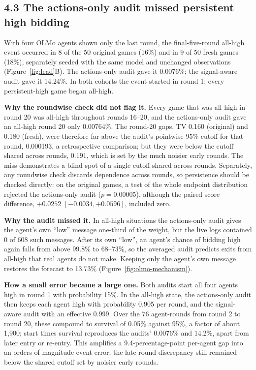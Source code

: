 \documentclass[11pt,letterpaper]{article}
\begin{document}
\subsection{4.3 The actions-only audit missed persistent high bidding}

With four OLMo agents shown only the last round, the final-five-round all-high event occurred in 8 of the 50 original games (16\%) and in 9 of 50 fresh games (18\%), separately seeded with the same model and unchanged observations (Figure~\ref{fig:lead}B).
The actions-only audit gave it 0.0076\%; the signal-aware audit gave it 14.24\%.
In both cohorts the event started in round 1: every persistent-high game began all-high.

\textbf{Why the roundwise check did not flag it.}
Every game that was all-high in round 20 was all-high throughout rounds 16--20, and the actions-only audit gave an all-high round 20 only 0.00764\%.
The round-20 gaps, TV 0.160 (original) and 0.180 (fresh), were therefore far above the audit's pointwise 95\% cutoff for that round, 0.000193, a retrospective comparison; but they were below the cutoff shared across rounds, 0.191, which is set by the much noisier early rounds.
The miss demonstrates a blind spot of a single cutoff shared across rounds.
Separately, any roundwise check discards dependence across rounds, so persistence should be checked directly: on the original games, a test of the whole endpoint distribution rejected the actions-only audit ($p = 0.00005$), although the paired score difference, $+0.0252$ $[-0.0034, +0.0596]$, included zero.

\textbf{Why the audit missed it.}
In all-high situations the actions-only audit gives the agent's own ``low'' message one-third of the weight, but the live logs contained 0 of 608 such messages.
After its own ``low'', an agent's chance of bidding high again falls from above 99.8\% to 68--73\%, so the averaged audit predicts exits from all-high that real agents do not make.
Keeping only the agent's own message restores the forecast to 13.73\% (Figure~\ref{fig:olmo-mechanism}).

\textbf{How a small error became a large one.}
Both audits start all four agents high in round 1 with probability 15\%.
In the all-high state, the actions-only audit then keeps each agent high with probability 0.905 per round, and the signal-aware audit with an effective 0.999.
Over the 76 agent-rounds from round 2 to round 20, these compound to survival of 0.05\% against 95\%, a factor of about 1,900; start times survival reproduces the audits' 0.0076\% and 14.2\%, apart from later entry or re-entry.
This amplifies a 9.4-percentage-point per-agent gap into an orders-of-magnitude event error; the late-round discrepancy still remained below the shared cutoff set by noisier early rounds.
\end{document}
